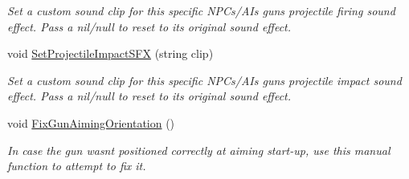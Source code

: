 \begin{DoxyCompactItemize}
\begin{DoxyCompactList}\small\item\em Set a custom sound clip for this specific N\+P\+Cs/\+A\+Is gun\textquotesingle{}s projectile firing sound effect. Pass a nil/null to reset to its original sound effect. \end{DoxyCompactList}\item 
void \mbox{\hyperlink{class_lua_1_1_shooting_aa89af0a3474a9f2ac09e3305986df10d}{Set\+Projectile\+Impact\+S\+FX}} (string clip)
\begin{DoxyCompactList}\small\item\em Set a custom sound clip for this specific N\+P\+Cs/\+A\+Is gun\textquotesingle{}s projectile impact sound effect. Pass a nil/null to reset to its original sound effect. \end{DoxyCompactList}\item 
void \mbox{\hyperlink{class_lua_1_1_shooting_a8bd9055060bba675e803483c5a1f71d2}{Fix\+Gun\+Aiming\+Orientation}} ()
\begin{DoxyCompactList}\small\item\em In case the gun wasn\textquotesingle{}t positioned correctly at aiming start-\/up, use this manual function to attempt to fix it. \end{DoxyCompactList}\end{DoxyCompactItemize}

